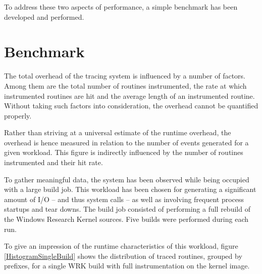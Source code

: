 To address these two aspects of performance, a simple benchmark has been developed and
performed.

\section{Benchmark}
The total overhead of the tracing system is influenced by a number of factors. Among them are the 
total number of routines instrumented, the rate at which instrumented routines are hit
and the average length of an instrumented routine. Without taking such factors
into consideration, the overhead cannot be quantified properly.

Rather than striving at a universal estimate of the runtime overhead, the overhead
is hence measured in relation to the number of events generated for a given workload. 
This figure is indirectly influenced by the number of routines instrumented and their hit rate.

To gather meaningful data, the system has been observed while being occupied with a
large build job. This workload has been chosen for generating a significant amount
of I/O -- and thus system calls -- as well as involving frequent process
startups and tear downs. The build job consisted of performing a full rebuild of the
Windows Research Kernel sources. Five builds were performed during each run.

To give an impression of the runtime characteristics of this workload, figure 
\ref{HistogramSingleBuild} shows the distribution of traced routines, grouped by prefixes,
for a single WRK build with full instrumentation on the kernel image.

